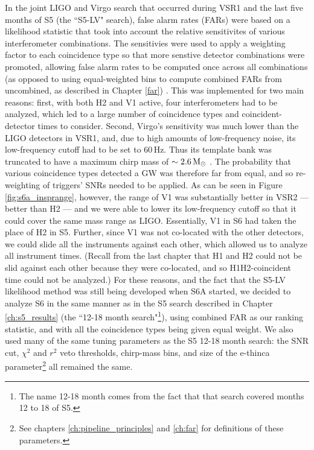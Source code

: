 In the joint LIGO and Virgo search that occurred during \ac{VSR1} and the last
five months of \ac{S5} (the ``S5-LV" search), false alarm rates (FARs) were
based on a likelihood statistic that took into account the relative
sensitivites of various interferometer combinations. The sensitivies were used
to apply a weighting factor to each coincidence type so that more senstive
detector combinations were promoted, allowing false alarm rates to be computed
once across all combinations (as opposed to using equal-weighted bins to
compute combined \acp{FAR} from uncombined, as described in Chapter \ref{far})
\cite{S5LowMassLV}. This was implemented for two main reasons: first, with both
H2 and V1 active, four interferometers had to be analyzed, which led to a large
number of coincidence types and coincident-detector times to consider. Second,
Virgo's sensitivity was much lower than the \ac{LIGO} detectors in VSR1, and,
due to high amounts of low-frequency noise, its low-frequency cutoff had to be
set to $60\,$Hz. Thus its template bank was truncated to have a maximum chirp
mass of $\sim2.6\,\mathrm{M_\odot}$ \cite{S5LowMassLV}. The probability that various
coincidence types detected a \ac{GW} was therefore far from equal, and so
re-weighting of triggers' \acp{SNR} needed to be applied. As can be seen in
Figure \ref{fig:s6a_insprange}, however, the range of V1 was substantially
better in \ac{VSR2} --- better than H2 --- and we were able to lower its
low-frequency cutoff so that it could cover the same mass range as \ac{LIGO}.
Essentially, V1 in S6 had taken the place of H2 in S5. Further, since V1 was
not co-located with the other detectors, we could slide all the instruments
against each other, which allowed us to analyze all instrument times. (Recall
from the last chapter that H1 and H2 could not be slid against each other
because they were co-located, and so H1H2-coincident time could not be
analyzed.) For these reasons, and the fact that the \ac{S5}-LV likelihood
method was still being developed when S6A started, we decided to analyze
\ac{S6} in the same manner as in the \ac{S5} search described in Chapter
\ref{ch:s5_results} (the ``12-18 month search"\footnote{The name 12-18 month
comes from the fact that that search covered months 12 to 18 of S5.}), using
combined \ac{FAR} as our ranking statistic, and with all the coincidence types
being given equal weight. We also used many of the same tuning parameters as
the \ac{S5} 12-18 month search: the \ac{SNR} cut, $\chi^2$ and $r^2$ veto
thresholds, chirp-mass bins, and size of the e-thinca parameter\footnote{See
chapters \ref{ch:pipeline_principles} and \ref{ch:far} for definitions of these
parameters.} all remained the same.

